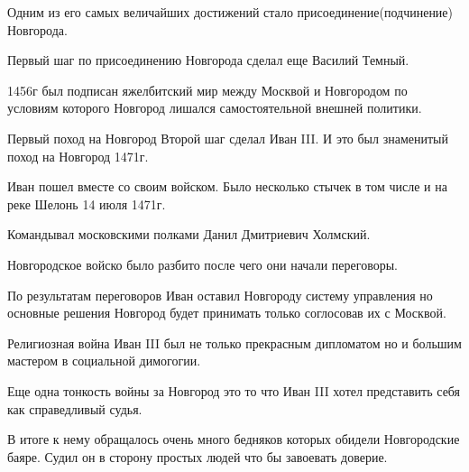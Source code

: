 \begin{frame}{}

	Одним из его самых величайших достижений стало присоединение(подчинение) Новгорода.

\end{frame}

\begin{frame}{}
	Первый шаг по присоединению Новгорода сделал еще Василий Темный.

	1456г был подписан яжелбитский мир между Москвой и Новгородом по условиям которого Новгород лишался самостоятельной внешней политики.
\end{frame}

\begin{frame}{Первый поход на Новгород}
	Второй шаг сделал Иван III. И это был знаменитый поход на Новгород 1471г.

	Иван пошел вместе со своим войском. Было несколько стычек в том числе и на реке Шелонь 14 июля 1471г.

	Командывал московскими полками Данил Дмитриевич Холмский.

	Новгородское войско было разбито после чего они начали переговоры.
\end{frame}

\begin{frame}
	По результатам переговоров Иван оставил Новгороду систему управления но основные решения Новгород будет принимать только соглосовав их с Москвой.
\end{frame}

\begin{frame}{Религиозная война}
	Иван III был не только прекрасным дипломатом но и большим мастером в социальной димогогии.
\end{frame}

\begin{frame}{}
	Еще одна тонкость войны за Новгород это то что Иван III хотел представить себя как справедливый судья.
\end{frame}

\begin{frame}{}
	В итоге к нему обращалось очень много бедняков которых обидели Новгородские баяре. Судил он в сторону простых людей что бы завоевать доверие.
\end{frame}


